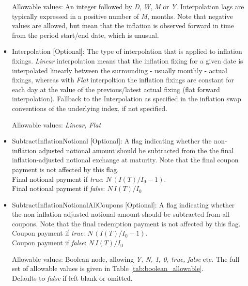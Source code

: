 \begin{itemize}
Allowable values: An integer followed by \emph{D}, \emph{W}, \emph{M} or \emph{Y}. Interpolation lags are typically expressed in a positive number of  \emph{M}, months. Note that negative values are allowed, but mean that the inflation is observed forward in time from the period start/end date, which is unusual.  

\item Interpolation [Optional]: The type of interpolation that is applied to inflation fixings. \emph{Linear} interpolation means that the inflation fixing for a given date is interpolated linearly between the surrounding - usually monthly - actual fixings, whereas with  \emph{Flat} interpoltion the inflation fixings are constant for each day at the value of the previous/latest actual fixing (flat forward interpolation).  
Fallback to the Interpolation as specified in the inflation swap conventions of the underlying index, if not specified. 

Allowable values:  \emph{Linear, Flat} 

\item SubtractInflationNotional [Optional]: A flag indicating whether
  the non-inflation adjusted notional amount should be subtracted from
  the the final inflation-adjusted notional exchange at maturity.
  Note that the final coupon payment is not affected by this flag. \\ 
Final notional payment if \emph{true}: $N \,(I(T)/I_0-1)$. \\ 
Final notional payment if  \emph{false}: $N \,I(T)/I_0$ 

\item SubtractInflationNotionalAllCoupons [Optional]: A flag indicating whether
  the non-inflation adjusted notional amount should be subtracted from
  all coupons.
  Note that the final redemption payment is not affected by this flag. \\ 
Coupon payment if \emph{true}: $N \,(I(T)/I_0-1)$. \\ 
Coupon payment if  \emph{false}: $N \,I(T)/I_0$ 

Allowable values: Boolean node, allowing \emph{Y, N, 1, 0, true, false} etc. The full set of allowable values is given in Table \ref{tab:boolean_allowable}.
\\Defaults to \emph{false}  if left blank or omitted.


\end{itemize}
